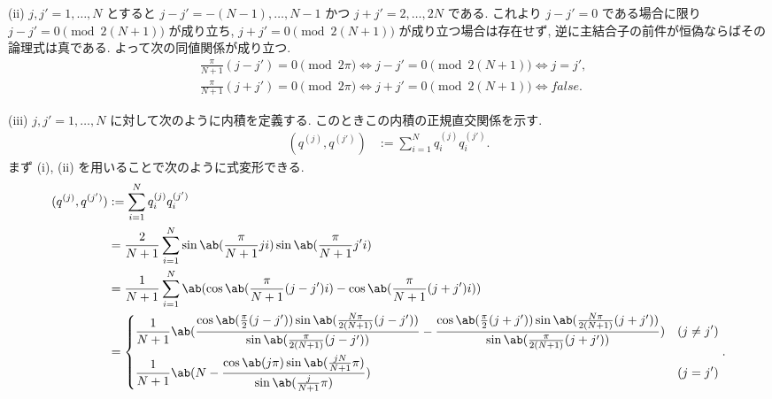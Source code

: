 \documentclass[uplatex,dvipdfmx,a4paper,11pt]{jlreq}
\numberwithin{equation}{section}
\theoremstyle{definition}
\begin{document}
(ii) $j, j' = 1,\ldots,N$ とすると $j - j' = -(N - 1),\ldots,N - 1$ かつ $j + j' = 2,\ldots,2N$ である. これより $j - j' = 0$ である場合に限り $j - j' = 0 \pmod{2(N+1)}$ が成り立ち, $j + j' = 0 \pmod{2(N+1)}$ が成り立つ場合は存在せず, 逆に主結合子の前件が恒偽ならばその論理式は真である. よって次の同値関係が成り立つ.
\begin{align}
   & \frac{\pi}{N+1}(j - j') = 0 \pmod{2\pi} \iff j - j' = 0 \pmod{2(N+1)} \iff j = j', \label{Q17-3. ii-1} \\
   & \frac{\pi}{N+1}(j + j') = 0 \pmod{2\pi} \iff j + j' = 0 \pmod{2(N+1)} \iff false. \label{Q17-3. ii-2}
\end{align}

(iii) $j, j' = 1,\ldots,N$ に対して次のように内積を定義する. このときこの内積の正規直交関係を示す.
\begin{align}
  (q^{(j)}, q^{(j')}) & := \sum_{i = 1}^{N}q_i^{(j)}q_i^{(j')}.
\end{align}
まず (i), (ii) を用いることで次のように式変形できる.
\begin{align}
  (q^{(j)}, q^{(j')}) & := \sum_{i = 1}^{N}q_i^{(j)}q_i^{(j')}                                                                                                                                                                                                                                             \\
                      & = \frac{2}{N+1}\sum_{i = 1}^{N}\sin\ab(\frac{\pi}{N+1}ji)\sin\ab(\frac{\pi}{N+1}j'i)                                                                                                                                                                                               \\
                      & = \frac{1}{N+1}\sum_{i = 1}^{N}\ab(\cos\ab(\frac{\pi}{N+1}(j - j')i) - \cos\ab(\frac{\pi}{N+1}(j + j')i))                                                                                                                                                                          \\
                      & = \begin{dcases}
                            \frac{1}{N+1}\ab(\frac{\cos\ab(\frac{\pi}{2}(j - j'))\sin\ab(\frac{N\pi}{2(N+1)}(j - j'))}{\sin\ab(\frac{\pi}{2(N+1)}(j - j'))} - \frac{\cos\ab(\frac{\pi}{2}(j + j'))\sin\ab(\frac{N\pi}{2(N+1)}(j + j'))}{\sin\ab(\frac{\pi}{2(N+1)}(j + j'))}) & (j \neq j') \\
                            \frac{1}{N+1}\ab(N - \frac{\cos\ab(j\pi)\sin\ab(\frac{jN}{N+1}\pi)}{\sin\ab(\frac{j}{N+1}\pi)})                                                                                                                                                   & (j = j')
                          \end{dcases}.
\end{align}
\end{document}
